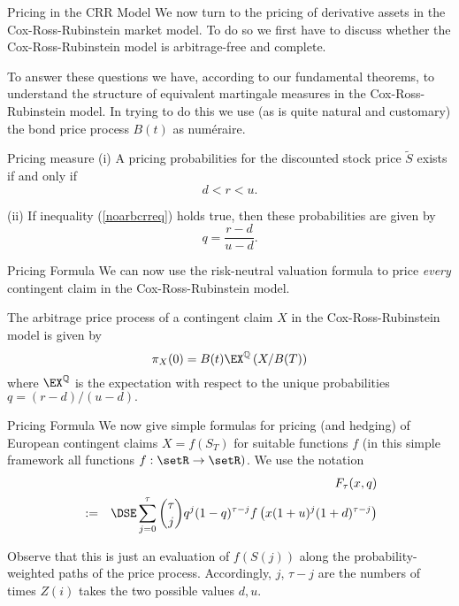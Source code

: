 Pricing in the CRR Model
	We now turn to the pricing of derivative assets in the
	Cox-Ross-Rubinstein market model. To do so we first have to
	discuss whether the Cox-Ross-Rubinstein model is arbitrage-free
	and complete.
 
	To answer these questions we have, according to our fundamental
	theorems, to understand the structure of equivalent martingale measures 
	in the Cox-Ross-Rubinstein model. In trying to do this we use (as is
	quite natural and customary) the bond price process $B(t)$ as
	num\'{e}raire.


Pricing measure
	(i) A pricing probabilities for the discounted stock price $\tilde{S}$ exists if and only if
	\begin{equation}\label{noarbcrreq}
	d < r < u.
	\end{equation}

	(ii) If inequality (\ref{noarbcrreq}) holds true, then these probabilities are given by
	\begin{equation}\label{crrprob}
	q=\frac{r-d}{u-d}.
	\end{equation}


Pricing Formula
	We can now use the risk-neutral valuation formula to price {\it
	every} contingent claim in the Cox-Ross-Rubinstein model.
  
	The arbitrage price process of a contingent claim $X$ in the
	Cox-Ross-Rubinstein model is given by
		$$
		\pi_X(0) = B(t) \EX^\mathbb{Q}\left( X/B(T)\right)
		$$
	where $\EX^\mathbb{Q}$ is the expectation with respect to the
	unique probabilities
	$q= (r-d)/(u-d).$


Pricing Formula
	We now give simple formulas for pricing (and hedging) of European
	contingent claims $X=f(S_T)$ for suitable functions $f$ (in this
	simple framework all functions $f:\setR \rightarrow \setR)$. We
	use the notation
		\begin{eqnarray}\label{BinomialF}
		&& F_\tau(x,q)\\\nonumber
		&:=&\DSE \sum_{j=0}^\tau {\tau \choose j} q^j (1-q)^{\tau-j}
		f\left(x(1+u)^j(1+d)^{\tau-j}\right)
		\end{eqnarray}
	
	Observe that this is just an evaluation of $f(S(j))$ along the
	probability-weighted paths of the price process. Accordingly, $j$,
	$\tau-j$ are the numbers of times $Z(i)$ takes the two possible
	values $d, u$.


